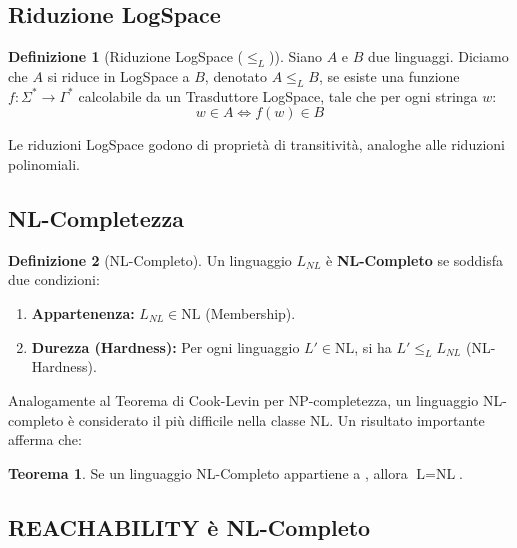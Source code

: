 \documentclass[a4paper]{article}
\theoremstyle{definition} %
\newtheorem{theorem}{Teorema}
[section]
\newtheorem{definition}{Definizione}[section]
\begin{document}
\subsection{Riduzione LogSpace}

\begin{definition}[Riduzione LogSpace ($\le_L$)]
Siano $A$ e $B$ due linguaggi. Diciamo che $A$ si riduce in LogSpace a $B$, denotato $A \le_L B$, se esiste una funzione $f: \Sigma^* \to \Gamma^*$ calcolabile da un Trasduttore LogSpace, tale che per ogni stringa $w$:
\[ w \in A \iff f(w) \in B \]
\end{definition}
Le riduzioni LogSpace godono di proprietà di transitività, analoghe alle riduzioni polinomiali.

\subsection{NL-Completezza}

\begin{definition}[NL-Completo]
Un linguaggio $L_{NL}$ è \textbf{NL-Completo} se soddisfa due condizioni:
\begin{enumerate}
    \item \textbf{Appartenenza:} $L_{NL} \in \text{NL}$ (Membership).
    \item \textbf{Durezza (Hardness):} Per ogni linguaggio $L' \in \text{NL}$, si ha $L' \le_L L_{NL}$ (NL-Hardness).
\end{enumerate}
\end{definition}
Analogamente al Teorema di Cook-Levin per NP-completezza, un linguaggio NL-completo è considerato il più difficile nella classe NL. Un risultato importante afferma che:
\begin{theorem}
Se un linguaggio NL-Completo appartiene a , allora $\text{L} = \text{NL}$.
\end{theorem}

\subsection{REACHABILITY è NL-Completo}
\end{document}
